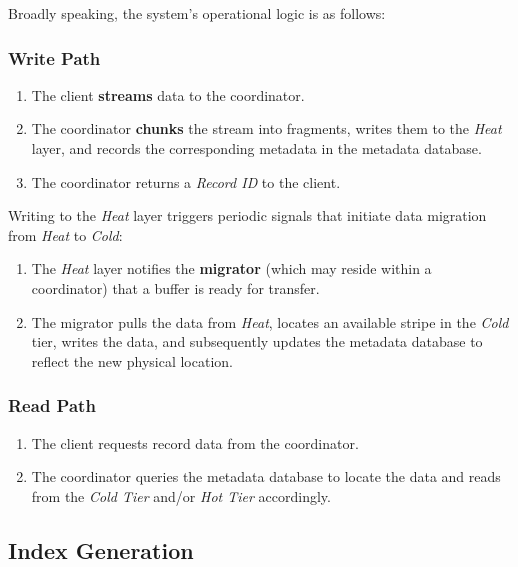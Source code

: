 \documentclass[a4paper,12pt]{article}
\begin{document}
    Broadly speaking, the system's operational logic is as follows:

    \subsubsection{Write Path}

    \begin{enumerate}
        \item The client \textbf{streams} data to the coordinator.
        \item The coordinator \textbf{chunks} the stream into fragments, writes them to the \textit{Heat} layer, and records the corresponding metadata in the metadata database.
        \item The coordinator returns a \textit{Record ID} to the client.
    \end{enumerate}

    Writing to the \textit{Heat} layer triggers periodic signals that initiate data migration from \textit{Heat} to \textit{Cold}:

    \begin{enumerate}
        \item The \textit{Heat} layer notifies the \textbf{migrator} (which may reside within a coordinator) that a buffer is ready for transfer.
        \item The migrator pulls the data from \textit{Heat}, locates an available stripe in the \textit{Cold} tier, writes the data, and subsequently updates the metadata database to reflect the new physical location.
    \end{enumerate}

    \subsubsection{Read Path}

    \begin{enumerate}
        \item The client requests record data from the coordinator.
        \item The coordinator queries the metadata database to locate the data and reads from the \textit{Cold Tier} and/or \textit{Hot Tier} accordingly.
    \end{enumerate}

    \subsection{Index Generation}
\end{document}
